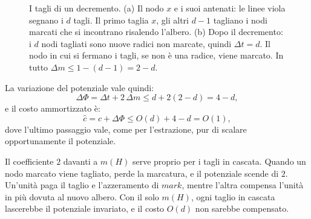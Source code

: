 \begin{figure}[htbp]
\centering
{}
\caption{I tagli di un decremento. (a) Il nodo $x$ e i suoi antenati: le linee viola segnano i $d$ tagli. Il primo taglia $x$, gli altri $d - 1$ tagliano i nodi marcati che si incontrano risalendo l'albero. (b) Dopo il decremento: i $d$ nodi tagliati sono nuove radici non marcate, quindi $\Delta t = d$. Il nodo in cui si fermano i tagli, se non è una radice, viene marcato. In tutto $\Delta m \le 1 - (d-1) = 2 - d$.}
\label{fig:hf-tagli}
\end{figure}

La variazione del potenziale vale quindi:
\[
\Delta\Phi = \Delta t + 2\,\Delta m \le d + 2(2 - d) = 4 - d,
\]
e il costo ammortizzato è:
\[
\hat{c} = c + \Delta\Phi \le O(d) + 4 - d = O(1),
\]
dove l'ultimo passaggio vale, come per l'estrazione, pur di scalare opportunamente il potenziale.

\begin{osservazione}[Perché $2\,m(H)$]
Il coefficiente $2$ davanti a $m(H)$ serve proprio per i tagli in cascata. Quando un nodo marcato viene tagliato, perde la marcatura, e il potenziale scende di $2$. Un'unità paga il taglio e l'azzeramento di $\mathit{mark}$, mentre l'altra compensa l'unità in più dovuta al nuovo albero. Con il solo $m(H)$, ogni taglio in cascata lascerebbe il potenziale invariato, e il costo $O(d)$ non sarebbe compensato.
\end{osservazione}

